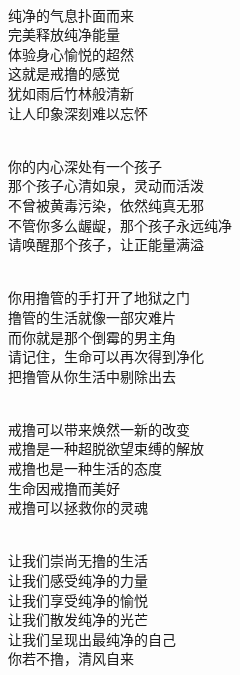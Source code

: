 \begin{poem}
    \begin{multicols}{2}
        \begin{center}~\\
            纯净的气息扑面而来 \\ 完美释放纯净能量 \\ 体验身心愉悦的超然 \\ 这就是戒撸的感觉 \\ 犹如雨后竹林般清新 \\ 让人印象深刻难以忘怀

            ~\\

            你的内心深处有一个孩子 \\ 那个孩子心清如泉，灵动而活泼 \\ 不曾被黄毒污染，依然纯真无邪 \\ 不管你多么龌龊，那个孩子永远纯净 \\ 请唤醒那个孩子，让正能量满溢

            ~\\

            你用撸管的手打开了地狱之门 \\ 撸管的生活就像一部灾难片 \\ 而你就是那个倒霉的男主角 \\ 请记住，生命可以再次得到净化 \\ 把撸管从你生活中剔除出去

            ~\\

            戒撸可以带来焕然一新的改变 \\ 戒撸是一种超脱欲望束缚的解放 \\ 戒撸也是一种生活的态度 \\ 生命因戒撸而美好 \\ 戒撸可以拯救你的灵魂

            ~\\

            让我们崇尚无撸的生活 \\ 让我们感受纯净的力量 \\ 让我们享受纯净的愉悦 \\ 让我们散发纯净的光芒 \\ 让我们呈现出最纯净的自己 \\ 你若不撸，清风自来
        \end{center}
    \end{multicols}
\end{poem}
